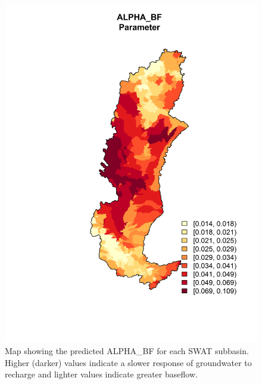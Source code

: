 \begin{figure}[h!]
	\centering
	\includegraphics[width=\textwidth]{./img/alpha_bf.png}
	\caption[Map showing the predicted ALPHA\_BF for each SWAT subbasin]{Map showing the predicted ALPHA\_BF for each SWAT subbasin. Higher (darker) values indicate a slower response of groundwater to recharge and lighter
	values indicate greater baseflow.}
	\label{fig:alpha_bf}
\end{figure}

